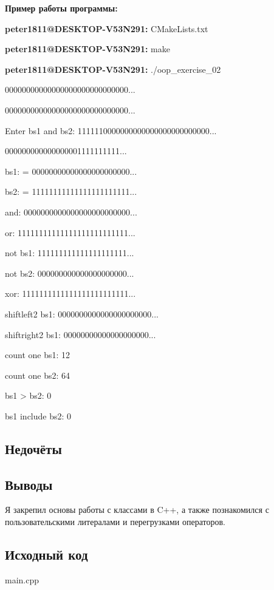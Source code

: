 \documentclass[12pt]{article}
\begin{document}
\begin{left}

\textbf{Пример работы программы: }

\textbf{peter1811@DESKTOP-V53N291:}  CMakeLists.txt
    
\textbf{peter1811@DESKTOP-V53N291:} make
    
\textbf{peter1811@DESKTOP-V53N291:} ./oop\_exercise\_02

00000000000000000000000000000...

00000000000000000000000000000...

Enter bs1 and bs2: 1111110000000000000000000000000...

000000000000000001111111111...

bs1: = 00000000000000000000000...

bs2: = 11111111111111111111111...

and: 0000000000000000000000000...

or: 11111111111111111111111111...

not bs1: 111111111111111111111...

not bs2: 000000000000000000000...

xor: 1111111111111111111111111...

shiftleft2 bs1: 0000000000000000000000...

shiftright2 bs1: 00000000000000000000...

count one bs1: 12

count one bs2: 64

bs1 > bs2: 0

bs1 include bs2: 0

\end{left}

\subsection*{Недочёты}


\subsection*{Выводы}

Я закрепил основы работы с классами в C++, а также познакомился с пользовательскими литералами и перегрузками операторов.


\vfill

\subsection*{Исходный код}

    
{\Huge main.cpp}
\inputminted{C++}{main.cpp}
    \pagebreak
    
\end{document}
